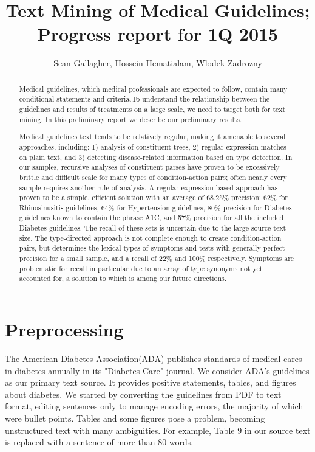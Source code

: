 \documentclass[12pt,letterpaper]{article}
\author{Sean Gallagher, Hossein Hematialam, Wlodek Zadrozny}
\title{Text Mining of Medical Guidelines; Progress report for 1Q 2015}
\begin{document}
\maketitle
\begin{abstract}
Medical guidelines, which medical professionals are expected to follow, contain many conditional statements and criteria.To understand the relationship between the guidelines and results of treatments on a large scale, we need to target both for text mining. In this preliminary report we describe our preliminary results.
 
Medical guidelines text tends to be relatively regular, making it amenable to several approaches, including: 1) analysis of constituent trees, 2) regular expression matches on plain text, and 3) detecting disease-related information based on type detection. In our samples, recursive analyses of constituent parses have proven to be excessively brittle and difficult scale for many types of condition-action pairs; often nearly every sample requires another rule of analysis. A regular expression based approach has proven to be a simple, efficient solution with an average of 68.25\% precision: 62\% for Rhinosinusitis guidelines, 64\% for Hypertension guidelines, 80\% precision for Diabetes guidelines known to contain the phrase A1C, and 57\% precision for all the included Diabetes guidelines. The recall of these sets is uncertain due to the large source text size. The type-directed approach is not complete enough to create condition-action pairs, but determines the lexical types of symptoms and tests with generally perfect precision for a small sample, and a recall of 22\% and 100\% respectively. Symptoms are problematic for recall in particular due to an array of type synonyms not yet accounted for, a solution to which is among our future directions.
\end{abstract}

\section{Preprocessing}
The American Diabetes Association(ADA) publishes standards of medical cares in diabetes annually in its "Diabetes Care" journal. We consider ADA's guidelines \cite{american2013diagnosis} as our primary text source. It provides positive statements, tables, and figures about diabetes. We started by converting the guidelines from PDF to text format, editing sentences only to manage encoding errors, the majority of which were bullet points. Tables and some figures pose a problem, becoming unstructured text with many ambiguities. For example, Table 9 in our source text is replaced with a sentence of more than 80 words.
\end{document}
